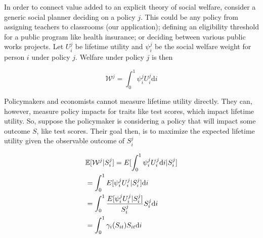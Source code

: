 \documentclass[12pt]{article}
\theoremstyle{definition}
\theoremstyle{definition}
\theoremstyle{definition}
\theoremstyle{definition}
\begin{document}
    
    
    
    In order to connect value added to an explicit theory of social welfare, consider a generic social planner deciding on a policy $j$. This could be any policy from assigning teachers to classrooms (our application);  defining an eligibility threshold for a public program like health insurance; or deciding between various public works projects. Let $U^j_i$ be lifetime utility and $\psi^j_i$ be the social welfare weight for person $i$ under policy $j$. Welfare under policy $j$ is then
        
        \begin{equation}
        \mathcal{W}^j =  \int_0^1 \psi^j_i U^j_i \text{d}i
        \end{equation}

  Policymakers and economists cannot measure lifetime utility directly. They can, however, measure policy impacts for traits like test scores, which impact lifetime utility. So, suppose the policymaker is considering a policy that will impact some outcome $S$, like test scores. Their goal then, is to maximize the expected lifetime utility given the observable outcome of $S_i^j$



  
    \begin{align}
           & \mathbb{E}[\mathcal{W}^j|S_i^j] = E[\int_0^1 \psi^j_i U^j_i \text{d}i|S_i^j] \\
           & = \int_0^1 E[\psi^j_i U^j_i |S_i^j] \text{d}i \\ 
           &  = \int_0^1 \frac{E[\psi^j_i U^j_i |S_i^j]}{S_i^j} S_i^j\text{d}i \\ 
          &   = \int_0^1 \gamma_i(S_{it}) S_{it} \text{d}i
    \end{align}
\end{document}
